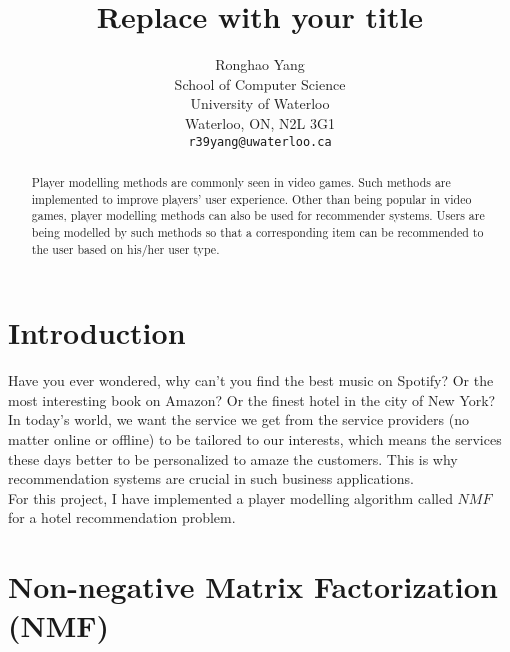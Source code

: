 \documentclass{article}
\title{Replace with your title}
\author{
	Ronghao Yang \\
	School of Computer Science\\
	University of Waterloo\\
	Waterloo, ON, N2L 3G1 \\
	\texttt{r39yang@uwaterloo.ca}
}
\begin{document}
\maketitle

\begin{abstract}
Player modelling methods are commonly seen in video games. Such methods are implemented to improve players' user experience. Other than being popular in video games, player modelling methods can also be used for recommender systems. Users are being modelled by such methods so that a corresponding item can be recommended to the user based on his/her user type.

\end{abstract}

\section{Introduction}
Have you ever wondered, why can't you find the best music on Spotify? Or the most interesting book on Amazon? Or the finest hotel in the city of New York? In today's world, we want the service we get from the service providers (no matter online or offline) to be tailored to our interests, which means the services these days better to be personalized to amaze the customers. This is why recommendation systems are crucial in such business applications.\\
For this project, I have implemented a player modelling algorithm called $NMF$ for a hotel recommendation problem. 
\section{Non-negative Matrix Factorization (NMF)}
\end{document}
